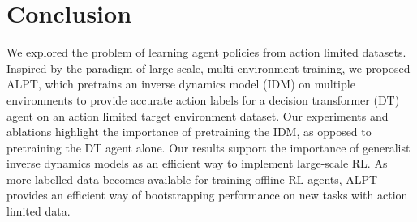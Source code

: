 \documentclass{article} %
\begin{document}
\section{Conclusion}
We explored the problem of learning agent policies from action limited datasets. 
Inspired by the paradigm of large-scale, multi-environment training, we proposed ALPT, which pretrains an inverse dynamics model (IDM) on multiple environments to provide accurate action labels for a decision transformer (DT) agent on an action limited target environment dataset.
Our experiments and ablations highlight the importance of pretraining the IDM, as opposed to pretraining the DT agent alone.  Our results  support the importance of generalist inverse dynamics models as an efficient way to implement large-scale RL.
As more labelled data becomes available for training offline RL agents, ALPT provides an efficient way of bootstrapping performance on new tasks with action limited data.
\end{document}
